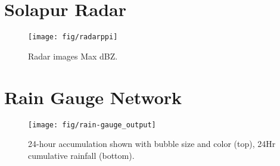 \documentclass[12pt,a4paper]{article} %
\begin{document}
\section{Solapur Radar}
\begin{figure}[H]
\centering
\texttt{[image: fig/radarppi]}
\caption{Radar images Max dBZ.}
\end{figure}



\section{Rain Gauge Network}
\begin{figure}[H]
\centering
\texttt{[image: fig/rain-gauge\_output]}
\caption{24-hour accumulation shown with bubble size and color (top), 24Hr cumulative rainfall (bottom).}

\end{figure}








\end{document}
